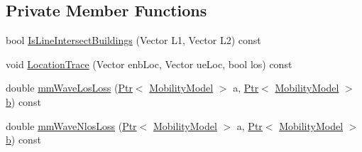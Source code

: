 \subsection*{Private Member Functions}
\begin{DoxyCompactItemize}
\item 
bool \hyperlink{classns3_1_1MmWave3gppBuildingsPropagationLossModel_a6bda988e9a066c968bb391ef158c7ed0}{Is\+Line\+Intersect\+Buildings} (Vector L1, Vector L2) const 
\item 
void \hyperlink{classns3_1_1MmWave3gppBuildingsPropagationLossModel_ae17b851f6c5814b01917c0af97a6c319}{Location\+Trace} (Vector enb\+Loc, Vector ue\+Loc, bool los) const 
\item 
double \hyperlink{classns3_1_1MmWave3gppBuildingsPropagationLossModel_aff8a9e7105d6af8ee1573f46cc2de66b}{mm\+Wave\+Los\+Loss} (\hyperlink{classns3_1_1Ptr}{Ptr}$<$ \hyperlink{classns3_1_1MobilityModel}{Mobility\+Model} $>$ a, \hyperlink{classns3_1_1Ptr}{Ptr}$<$ \hyperlink{classns3_1_1MobilityModel}{Mobility\+Model} $>$ \hyperlink{lte__pathloss_8m_a21ad0bd836b90d08f4cf640b4c298e7c}{b}) const 
\item 
double \hyperlink{classns3_1_1MmWave3gppBuildingsPropagationLossModel_ac8406d2b368ce20b2eae8a3e69e7a83d}{mm\+Wave\+Nlos\+Loss} (\hyperlink{classns3_1_1Ptr}{Ptr}$<$ \hyperlink{classns3_1_1MobilityModel}{Mobility\+Model} $>$ a, \hyperlink{classns3_1_1Ptr}{Ptr}$<$ \hyperlink{classns3_1_1MobilityModel}{Mobility\+Model} $>$ \hyperlink{lte__pathloss_8m_a21ad0bd836b90d08f4cf640b4c298e7c}{b}) const 
\end{DoxyCompactItemize}

